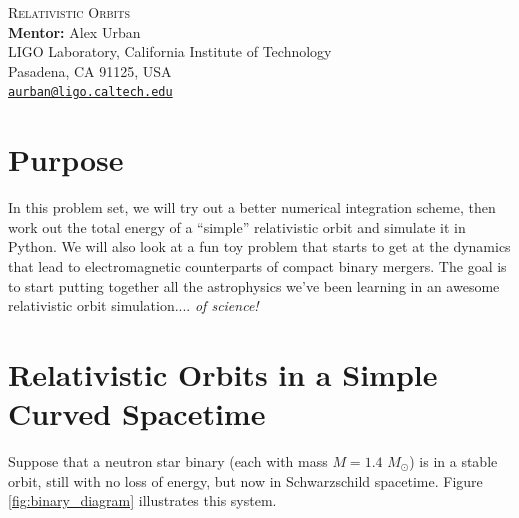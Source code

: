 \documentclass[11pt]{article}
\begin{document}
\begin{center}
{\Large\textsc{Relativistic Orbits}} \\
\vspace{10pt}
{\large \textbf{Mentor:} Alex Urban} \\
{\small LIGO Laboratory, California Institute of Technology \\
Pasadena, CA 91125, USA \\
\href{mailto:aurban@ligo.caltech.edu}{\texttt{aurban@ligo.caltech.edu}}}
\end{center}


\section*{Purpose}

\hspace{15pt} In this problem set, we will try out a better numerical integration scheme, then work out the total energy of a ``simple'' relativistic orbit and simulate it in Python. We will also look at a fun toy problem that starts to get at the dynamics that lead to electromagnetic counterparts of compact binary mergers. The goal is to start putting together all the astrophysics we've been learning in an awesome relativistic orbit simulation.... \textit{of science!}

\section*{Relativistic Orbits in a Simple Curved Spacetime}
\hspace{15pt} Suppose that a neutron star binary (each with mass $M = 1.4\,\, M_{\odot}$) is in a stable orbit, still with no loss of energy, but now in Schwarzschild spacetime. Figure \ref{fig:binary_diagram} illustrates this system.

\vspace{20pt}
\end{document}
